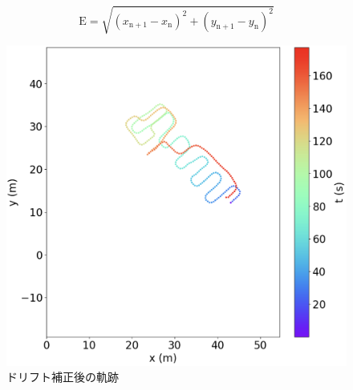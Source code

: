 \vspace{5mm} %
\begin{equation}
	\mathrm{E} = \sqrt{(x_{\mathrm{n+1}} - x_{\mathrm{n}})^2 + (y_{\mathrm{n+1}} - y_{\mathrm{n}})^2}
\end{equation}
\vspace{5mm} %

\begin{figure}[h]
	\centering
	\includegraphics[width=\linewidth]{image/pdr-remove-drift-two.jpg}
	\caption{ドリフト補正後の軌跡}    \label{fig:pdr-remove-drift}
\end{figure}


